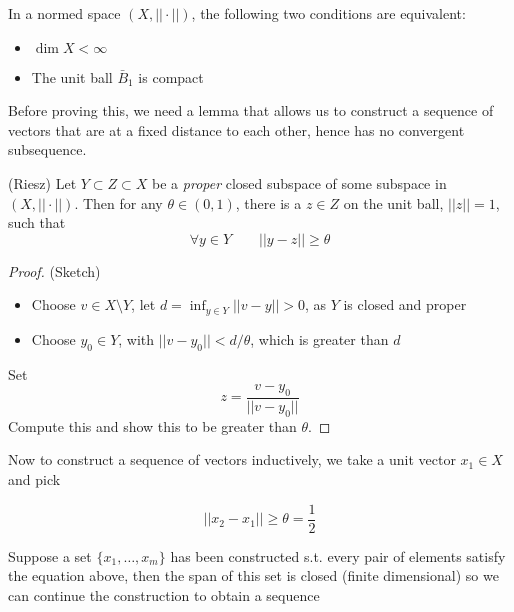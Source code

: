 \documentclass{article}
\begin{document}
\begin{theorem}
    In a normed space $(X, ||\cdot||)$, the following two conditions are equivalent:  
    \begin{itemize}
        \item $\dim X < \infty$
        \item The unit ball $\bar{B}_1$ is compact 
    \end{itemize}
\end{theorem}  
  
  
Before proving this, we need a lemma that allows us to construct a sequence of vectors
that are at a fixed distance to each other, hence has no convergent subsequence.  

\begin{lemma}
    (Riesz) Let $Y \subset Z \subset X$ be a \textit{proper} closed subspace of some subspace in $(X, ||\cdot||)$. Then for any $\theta \in (0,1)$, there is a $z\in Z$ on the unit ball, $||z||=1$, such that  
    \begin{equation*}
        \forall y \in Y \qquad ||y-z|| \geq \theta
    \end{equation*}
\end{lemma}  
\begin{proof}
(Sketch)  

\begin{itemize}
    \item Choose $v \in X \setminus Y$, let $d=\inf_{y\in Y}||v-y||>0$, as $Y$ is closed and proper
    \item Choose $y_0 \in Y$, with $||v-y_0||<d/\theta$, which is greater than $d$
\end{itemize}
Set
\begin{equation*}
    z = \frac{v-y_0}{||v-y_0||}
\end{equation*}  
Compute this and show this to be greater than $\theta$.
\end{proof}  

Now to construct a sequence of vectors inductively, we take a unit vector $x_1 \in X$ and pick  

\begin{equation*}
    ||x_2-x_1|| \geq \theta=\frac{1}{2}
\end{equation*}  

Suppose a set $\{x_1, \ldots, x_m\}$ has been constructed s.t. every pair of elements satisfy the equation above, then the span of this set is closed (finite dimensional) so we can continue the construction to obtain a sequence  
\end{document}
